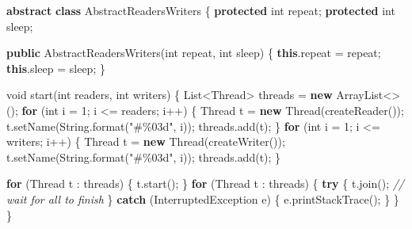 \documentclass[
]{article}
\newenvironment{Shaded}{\begin{snugshade}}{\end{snugshade}}
\newcommand{\BuiltInTok}[1]{#1}
\newcommand{\CommentTok}[1]{\textcolor[rgb]{0.56,0.35,0.01}{\textit{#1}}}
\newcommand{\DataTypeTok}[1]{\textcolor[rgb]{0.13,0.29,0.53}{#1}}
\newcommand{\DecValTok}[1]{\textcolor[rgb]{0.00,0.00,0.81}{#1}}
\newcommand{\FunctionTok}[1]{\textcolor[rgb]{0.00,0.00,0.00}{#1}}
\newcommand{\KeywordTok}[1]{\textcolor[rgb]{0.13,0.29,0.53}{\textbf{#1}}}
\newcommand{\NormalTok}[1]{#1}
\newcommand{\SpecialCharTok}[1]{\textcolor[rgb]{0.00,0.00,0.00}{#1}}
\newcommand{\StringTok}[1]{\textcolor[rgb]{0.31,0.60,0.02}{#1}}
\begin{document}
\begin{Shaded}
\begin{Highlighting}[]
\KeywordTok{abstract} \KeywordTok{class}\NormalTok{ AbstractReadersWriters}
\NormalTok{\{}
    \KeywordTok{protected} \DataTypeTok{int}\NormalTok{ repeat;}
    \KeywordTok{protected} \DataTypeTok{int}\NormalTok{ sleep;}

    \KeywordTok{public} \FunctionTok{AbstractReadersWriters}\NormalTok{(}\DataTypeTok{int}\NormalTok{ repeat, }\DataTypeTok{int}\NormalTok{ sleep) \{}
        \KeywordTok{this}\NormalTok{.}\FunctionTok{repeat}\NormalTok{ = repeat;}
        \KeywordTok{this}\NormalTok{.}\FunctionTok{sleep}\NormalTok{ = sleep;}
\NormalTok{    \}}


    \DataTypeTok{void} \FunctionTok{start}\NormalTok{(}\DataTypeTok{int}\NormalTok{ readers, }\DataTypeTok{int}\NormalTok{ writers)}
\NormalTok{    \{}
        \BuiltInTok{List}\NormalTok{\textless{}}\BuiltInTok{Thread}\NormalTok{\textgreater{} threads = }\KeywordTok{new} \BuiltInTok{ArrayList}\NormalTok{\textless{}\textgreater{}();}
        \KeywordTok{for}\NormalTok{ (}\DataTypeTok{int}\NormalTok{ i = }\DecValTok{1}\NormalTok{; i \textless{}= readers; i++) \{}
            \BuiltInTok{Thread}\NormalTok{ t = }\KeywordTok{new} \BuiltInTok{Thread}\NormalTok{(}\FunctionTok{createReader}\NormalTok{());}
\NormalTok{            t.}\FunctionTok{setName}\NormalTok{(}\BuiltInTok{String}\FunctionTok{.format}\NormalTok{(}\StringTok{"\#}\SpecialCharTok{\%03d}\StringTok{"}\NormalTok{, i));}
\NormalTok{            threads.}\FunctionTok{add}\NormalTok{(t);}
\NormalTok{        \}}
        \KeywordTok{for}\NormalTok{ (}\DataTypeTok{int}\NormalTok{ i = }\DecValTok{1}\NormalTok{; i \textless{}= writers; i++) \{}
            \BuiltInTok{Thread}\NormalTok{ t = }\KeywordTok{new} \BuiltInTok{Thread}\NormalTok{(}\FunctionTok{createWriter}\NormalTok{());}
\NormalTok{            t.}\FunctionTok{setName}\NormalTok{(}\BuiltInTok{String}\FunctionTok{.format}\NormalTok{(}\StringTok{"\#}\SpecialCharTok{\%03d}\StringTok{"}\NormalTok{, i));}
\NormalTok{            threads.}\FunctionTok{add}\NormalTok{(t);}
\NormalTok{        \}}

        \KeywordTok{for}\NormalTok{ (}\BuiltInTok{Thread}\NormalTok{ t : threads) \{}
\NormalTok{            t.}\FunctionTok{start}\NormalTok{();}
\NormalTok{        \}}
        \KeywordTok{for}\NormalTok{ (}\BuiltInTok{Thread}\NormalTok{ t : threads) \{}
            \KeywordTok{try}\NormalTok{ \{}
\NormalTok{                t.}\FunctionTok{join}\NormalTok{(); }\CommentTok{// wait for all to finish}
\NormalTok{            \} }\KeywordTok{catch}\NormalTok{ (}\BuiltInTok{InterruptedException}\NormalTok{ e) \{}
\NormalTok{                e.}\FunctionTok{printStackTrace}\NormalTok{();}
\NormalTok{            \}}
\NormalTok{        \}}
\NormalTok{    \}}


\end{Highlighting}
\end{Shaded}
\end{document}
